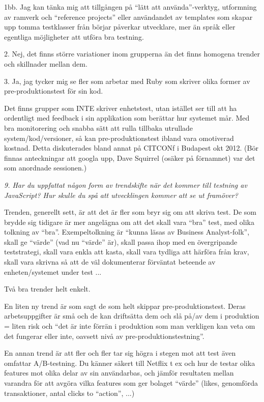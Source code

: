 \documentclass[11pt]{article}
\begin{document}
1bb. Jag kan tänka mig att tillgången på ``lätt att använda''-verktyg,
utformning av ramverk och ``reference projects'' eller användandet av
templates som skapar upp tomma testklasser från börjar påverkar
utvecklare, mer än språk eller egentliga möjligheter att utföra bra
testning.

2. Nej, det finns större variationer inom grupperna än det finns
homogena trender och skillnader mellan dem.

3. Ja, jag tycker mig se fler som arbetar med Ruby som skriver olika
former av pre-produktionstest för sin kod.

Det finns grupper som INTE skriver enhetstest, utan istället ser till
att ha ordentligt med feedback i sin applikation som berättar hur
systemet mår. Med bra monitorering och snabba sätt att rulla tillbaka
utrullade system/kod/versioner, så kan pre-produktionstest ibland vara
omotiverad kostnad. Detta diskuterades bland annat på CITCONf i Budapest
okt 2012. (Bör finnas anteckningar att googla upp, Dave Squirrel (osäker
på förnamnet) var det som anordnade sessionen.)

\emph{9. Har du uppfattat någon form av trendskifte när det kommer till
testning av JavaScript? Hur skulle du spå att utvecklingen kommer att
se ut framöver?}

Trenden, generellt sett, är att det är fler som bryr sig om att skriva
test. De som brydde sig tidigare är mer angelägna om att det skall vara
``bra'' test, med olika tolkning av ``bra''. Exempeltolkning är ``kunna läsas
av Business Analyst-folk'', skall ge ``värde'' (vad nu ``värde'' är), skall
passa ihop med en övergripande teststrategi, skall vara enkla att kasta,
skall vara tydliga att härföra från krav, skall vara skrivna så att de
väl dokumenterar förväntat beteende av enheten/systemet under test ...

Två bra trender helt enkelt.

En liten ny trend är som sagt de som helt skippar pre-produktionstest.
Deras arbetsuppgifter är små och de kan driftsätta dem och slå på/av dem
i produktion = liten risk och ``det är inte förrän i produktion som man
verkligen kan veta om det fungerar eller inte, oavsett nivå av
pre-produktionstestning''.

En annan trend är att fler och fler tar sig högra i stegen mot att test
även omfattar A/B-testning. Du känner säkert till Netflix t ex och hur
de testar olika features mot olika delar av sin användarbas, och jämför
resultaten mellan varandra för att avgöra vilka features som ger bolaget
``värde'' (likes, genomförda transaktioner, antal clicks to ``action'', ...)
\end{document}
